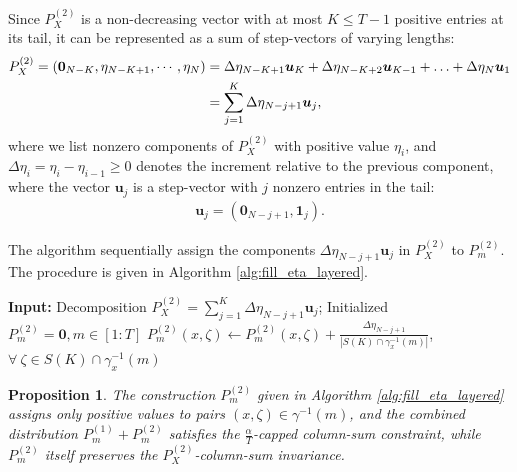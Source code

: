 \documentclass[11pt,letterpaper]{article}
\newtheorem{prop}{\textbf{Proposition}}
\begin{document}
Since $P_X^{(2)}$ is a non-decreasing vector with at most $K \leq T-1$ positive entries at its tail, it can be represented as a sum of step-vectors of varying lengths:
\begin{align}
    P_X^{(2)} = (\mathbf{0}_{N-K},\eta_{N-K+1}, \cdots, \eta_N) 
    & = \Delta\eta_{N-K+1} \boldsymbol{u}_{K} + \Delta\eta_{N-K+2} \boldsymbol{u}_{K-1} + \ldots + \Delta\eta_{N} \boldsymbol{u}_{1} \notag \\
    & = \sum_{j=1}^K \Delta\eta_{N-j+1} \boldsymbol{u}_{j}\label{eq:express_eta_i_same_eta},
\end{align}
where we list nonzero components of $P_X^{(2)}$ with positive value $\eta_i$, and $\Delta\eta_i = \eta_i - \eta_{i-1} \geq 0 $ denotes the increment relative to the previous component, where the vector $\boldsymbol{u}_j$ is a step-vector with $j$ nonzero entries in the tail:
\begin{align}
    \boldsymbol{u}_j = (\mathbf{0}_{N-j+1}, \mathbf{1}_{j}).
\end{align}

The algorithm sequentially assign the components $\Delta\eta_{N-j+1}\boldsymbol{u}_j$ in $P_X^{(2)}$ to $P_m^{(2)}$. The procedure is given in Algorithm \ref{alg:fill_eta_layered}.


\begin{algorithm}[h]
\caption{$P_m^{(2)}$: Layered Step-vector Allocation}
\label{alg:fill_eta_layered}
\begin{algorithmic}[1]
\State \textbf{Input:} Decomposition $P_X^{(2)} = \sum_{j=1}^K \Delta\eta_{N-j+1}\boldsymbol{u}_j$; Initialized $P^{(2)}_m = \mathbf{0}, m \in [1:T]$ 
        \State $P_m^{(2)}(x, \zeta) \gets P_m^{(2)}(x, \zeta) + \frac{\Delta \eta_{N-j+1}}{|S(K) \cap \gamma_x^{-1}(m)|}$,   $ \forall \ \zeta \in S(K) \cap \gamma_x^{-1}(m)$
    \EndFor
\EndFor
\end{algorithmic}
\end{algorithm}


\begin{prop} \label{prop:construct_pm2}
    The construction $P_m^{(2)}$ given in Algorithm \ref{alg:fill_eta_layered} assigns only positive values to pairs $(x, \zeta) \in \gamma^{-1}(m)$, and the combined distribution $P_m^{(1)} + P_m^{(2)}$ satisfies the $\tfrac{\alpha}{T}$-capped column-sum constraint, while $P_m^{(2)}$ itself preserves the $P_X^{(2)}$-column-sum invariance.
\end{prop}
\end{document}
